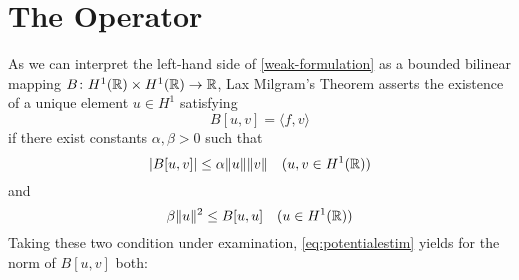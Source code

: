 \chapter{The Operator}

As we can interpret the left-hand side of \eqref{weak-formulation} as a bounded bilinear mapping $B \colon H^{1}(\mathbb{R}) \times H^{1}(\mathbb{R}) \rightarrow \mathbb{R}$, Lax Milgram's Theorem asserts the existence of a unique element $u \in H^{1}$ satisfying
\begin{equation*}
	B[u, v] = \langle f, v \rangle
\end{equation*}
if there exist constants $\alpha, \beta > 0$ such that
	\[ \left| B[u,v] \right| \leq \alpha \|u\| \|v\| \quad (u, v \in H^{1}(\mathbb{R})) \]
and
	\[ \beta \|u\|^{2} \leq B[u, u] \quad (u \in H^{1}(\mathbb{R})) \]
Taking these two condition under examination, \eqref{eq:potentialestim} yields for the norm of $B[u, v]$ both: \newpage %

